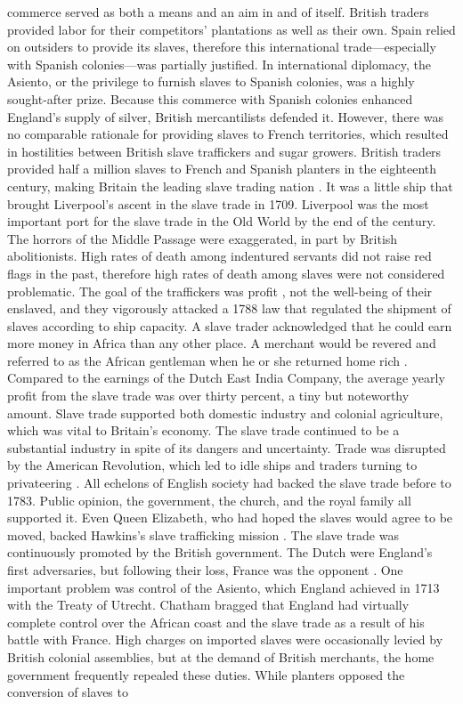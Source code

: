 commerce served as both a means and an aim in and of itself. British traders provided labor for their competitors' plantations as well as their own. Spain relied on outsiders to provide its slaves, therefore this international trade—especially with Spanish colonies—was partially justified. In international diplomacy, the Asiento, or the privilege to furnish slaves to Spanish colonies, was a highly sought-after prize. Because this commerce with Spanish colonies enhanced England's supply of silver, British mercantilists defended it. However, there was no comparable rationale for providing slaves to French territories, which resulted in hostilities between British slave traffickers and sugar growers. British traders provided half a million slaves to French and Spanish planters in the eighteenth century, making Britain the leading slave trading nation . It was a little ship that brought Liverpool's ascent in the slave trade in 1709. Liverpool was the most important port for the slave trade in the Old World by the end of the century. The horrors of the Middle Passage were exaggerated, in part by British abolitionists. High rates of death among indentured servants did not raise red flags in the past, therefore high rates of death among slaves were not considered problematic. The goal of the traffickers was profit , not the well-being of their enslaved, and they vigorously attacked a 1788 law that regulated the shipment of slaves according to ship capacity. A slave trader acknowledged that he could earn more money in Africa than any other place. A merchant would be revered and referred to as the African gentleman when he or she returned home rich . Compared to the earnings of the Dutch East India Company, the average yearly profit from the slave trade was over thirty percent, a tiny but noteworthy amount. Slave trade supported both domestic industry and colonial agriculture, which was vital to Britain's economy. The slave trade continued to be a substantial industry in spite of its dangers and uncertainty. Trade was disrupted by the American Revolution, which led to idle ships and traders turning to privateering . All echelons of English society had backed the slave trade before to 1783. Public opinion, the government, the church, and the royal family all supported it. Even Queen Elizabeth, who had hoped the slaves would agree to be moved, backed Hawkins's slave trafficking mission . The slave trade was continuously promoted by the British government. The Dutch were England's first adversaries, but following their loss, France was the opponent . One important problem was control of the Asiento, which England achieved in 1713 with the Treaty of Utrecht. Chatham bragged that England had virtually complete control over the African coast and the slave trade as a result of his battle with France. High charges on imported slaves were occasionally levied by British colonial assemblies, but at the demand of British merchants, the home government frequently repealed these duties. While planters opposed the conversion of slaves to 